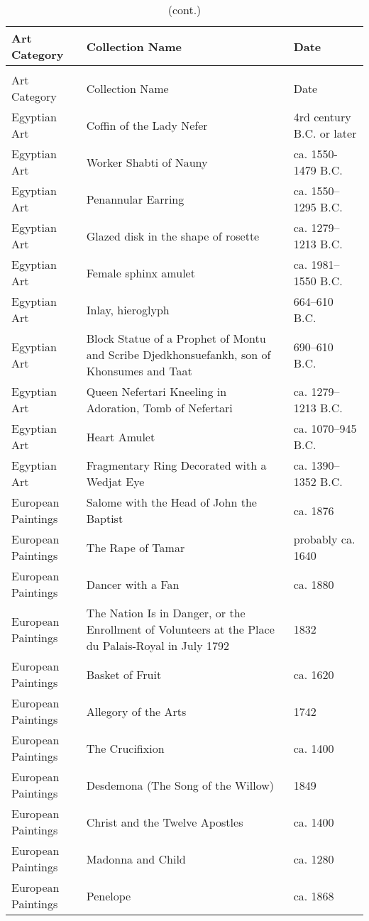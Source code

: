 \begin{longtable}{|p{3.2cm}|p{5cm}|p{4.2cm}|}
	\caption{The Metropolitan Museum Art Collection List \cite{metCollectionPage}} \\
	\toprule
	Art Category & Collection Name & Date \\
	\midrule
	\endfirsthead
	\caption[]{(cont.)} \\
	\toprule
	Art Category & Collection Name & Date \\
	\midrule
	\endhead
	\midrule
	\endfoot
	Egyptian Art & Coffin of the Lady Nefer & 4rd century B.C. or later \\
	Egyptian Art & Worker Shabti of Nauny & ca. 1550-1479 B.C. \\
	Egyptian Art & Penannular Earring & ca. 1550–1295 B.C. \\
	Egyptian Art & Glazed disk in the shape of rosette & ca. 1279–1213 B.C. \\
	Egyptian Art & Female sphinx amulet & ca. 1981–1550 B.C. \\
	Egyptian Art & Inlay, hieroglyph & 664–610 B.C. \\
	Egyptian Art & Block Statue of a Prophet of Montu and Scribe Djedkhonsuefankh, son of Khonsumes and Taat & 690–610 B.C. \\
	Egyptian Art & Queen Nefertari Kneeling in Adoration, Tomb of Nefertari & ca. 1279–1213 B.C. \\
	Egyptian Art & Heart Amulet & ca. 1070–945 B.C. \\
	Egyptian Art & Fragmentary Ring Decorated with a Wedjat Eye & ca. 1390–1352 B.C. \\
	European Paintings & Salome with the Head of John the Baptist & ca. 1876 \\
	European Paintings & The Rape of Tamar & probably ca. 1640 \\
	European Paintings & Dancer with a Fan & ca. 1880 \\
	European Paintings & The Nation Is in Danger, or the Enrollment of Volunteers at the Place du Palais-Royal in July 1792 & 1832 \\
	European Paintings & Basket of Fruit & ca. 1620 \\
	European Paintings & Allegory of the Arts & 1742 \\
	European Paintings & The Crucifixion & ca. 1400 \\
	European Paintings & Desdemona (The Song of the Willow) & 1849 \\
	European Paintings & Christ and the Twelve Apostles & ca. 1400 \\
	European Paintings & Madonna and Child & ca. 1280 \\
	European Paintings & Penelope & ca. 1868 \\
\end{longtable}